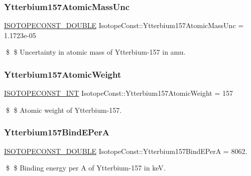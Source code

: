 \subsubsection{\texorpdfstring{Ytterbium157\+Atomic\+Mass\+Unc}{Ytterbium157AtomicMassUnc}}
{\footnotesize\ttfamily \mbox{\hyperlink{group___isotope_const-_macros_ga8f45a7272ce02c0b4c65c44636ed719a}{I\+S\+O\+T\+O\+P\+E\+C\+O\+N\+S\+T\+\_\+\+D\+O\+U\+B\+LE}} Isotope\+Const\+::\+Ytterbium157\+Atomic\+Mass\+Unc = 1.\+1723e-\/05}

\$ \$ Uncertainty in atomic mass of Ytterbium-\/157 in amu. \mbox{\label{group___isotope_const-_ytterbium-_yb157_ga4ee778fd06a8027f21bcb18bea9652a5}} 
\subsubsection{\texorpdfstring{Ytterbium157\+Atomic\+Weight}{Ytterbium157AtomicWeight}}
{\footnotesize\ttfamily \mbox{\hyperlink{group___isotope_const-_macros_ga5f18360b3e99483a35c32d789e62621c}{I\+S\+O\+T\+O\+P\+E\+C\+O\+N\+S\+T\+\_\+\+I\+NT}} Isotope\+Const\+::\+Ytterbium157\+Atomic\+Weight = 157}

\$ \$ Atomic weight of Ytterbium-\/157. \mbox{\label{group___isotope_const-_ytterbium-_yb157_ga64069e1ee23f096f95eccc0d86682cbd}} 
\subsubsection{\texorpdfstring{Ytterbium157\+Bind\+E\+PerA}{Ytterbium157BindEPerA}}
{\footnotesize\ttfamily \mbox{\hyperlink{group___isotope_const-_macros_ga8f45a7272ce02c0b4c65c44636ed719a}{I\+S\+O\+T\+O\+P\+E\+C\+O\+N\+S\+T\+\_\+\+D\+O\+U\+B\+LE}} Isotope\+Const\+::\+Ytterbium157\+Bind\+E\+PerA = 8062.}

\$ \$ Binding energy per A of Ytterbium-\/157 in keV. \mbox{\label{group___isotope_const-_ytterbium-_yb157_gabe997f861038ace75d76962f18ee03bd}} 
